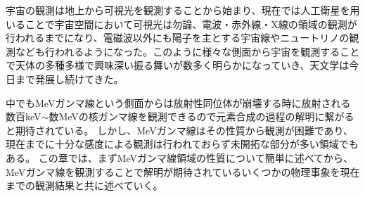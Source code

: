 %
宇宙の観測は地上から可視光を観測することから始まり、現在では人工衛星を用いることで宇宙空間において可視光は勿論、電波・赤外線・X線の領域の観測が行われるまでになり、電磁波以外にも陽子を主とする宇宙線やニュートリノの観測なども行われるようになった。このように様々な側面から宇宙を観測することで天体の多種多様で興味深い振る舞いが数多く明らかになっていき、天文学は今日まで発展し続けてきた。

中でもMeVガンマ線という側面からは放射性同位体が崩壊する時に放射される数百keV$\sim$数MeVの核ガンマ線を観測できるので元素合成の過程の解明に繋がると期待されている。
しかし、MeVガンマ線はその性質から観測が困難であり、現在までに十分な感度による観測は行われておらず未開拓な部分が多い領域でもある。
この章では、まずMeVガンマ線領域の性質について簡単に述べてから、MeVガンマ線を観測することで解明が期待されているいくつかの物理事象を現在までの観測結果と共に述べていく。




